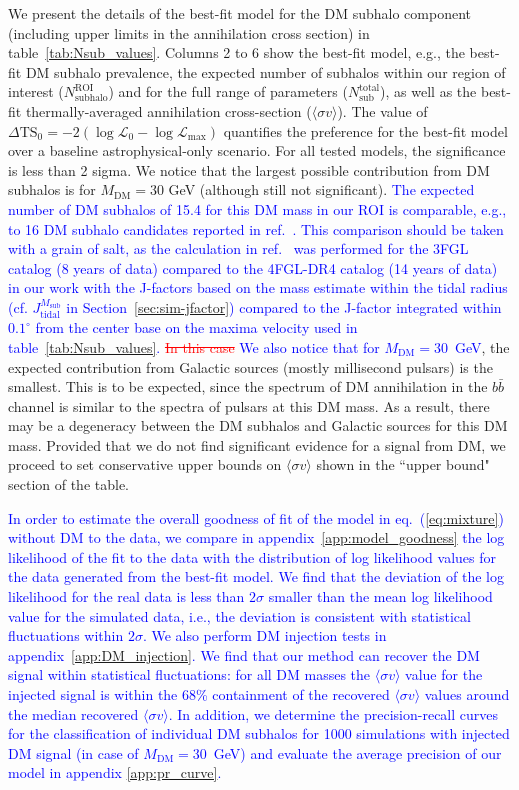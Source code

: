 \documentclass[12pt, a4paper]{article}
\newcommand{\new}[1]{\textcolor{blue}{#1}}
\newcommand{\old}[1]{\textcolor{red}{\st{#1}}}
\newcommand{\sigmav}{\langle \sigma v \rangle}
\newcommand{\Msub}{M_\textrm{sub}}
\newcommand{\mdm}{{M_\textrm{DM}}}
\begin{document}

We present the details of the best-fit model for the DM subhalo component (including upper limits in the annihilation cross section)
in table~\ref{tab:Nsub_values}.
Columns 2 to 6 show the best-fit model, e.g., the best-fit DM subhalo prevalence, the expected number of subhalos within our region of interest ($N_\textrm{subhalo}^\textrm{ROI}$) and for the full range of parameters ($N_\textrm{sub}^\textrm{total}$), as well as the best-fit thermally-averaged annihilation cross-section ($\sigmav$). The value of $\Delta \textrm{TS}_0 = -2(\log\mathcal{L}_0 - \log\mathcal{L}_\textrm{max})$ quantifies the preference for the best-fit model over a baseline astrophysical-only scenario. 
For all tested models, the significance is less than 2 sigma.
We notice that the largest possible contribution from DM subhalos is for $\mdm = 30$ GeV (although still not significant). 
\new{The expected number of DM subhalos of 15.4 for this DM mass  in our ROI is comparable, e.g., to 16 DM subhalo candidates reported in ref.~\cite{2019JCAP...07..020C}.
This comparison should be taken with a grain of salt, as the calculation in ref.~\cite{2019JCAP...07..020C} was performed for the 3FGL catalog (8 years of data) compared to the 4FGL-DR4 catalog (14 years of data) in our work with the J-factors based on the mass estimate within the tidal radius (cf. $J_\textrm{tidal}^{\Msub}$ in Section~\ref{sec:sim-jfactor}) compared to the J-factor integrated within $0.1^\circ$ from the center base on the maxima velocity used in table~\ref{tab:Nsub_values}.
}
\old{In this case} \new{We also notice that for $\mdm = 30$~GeV},  the expected contribution from Galactic sources (mostly millisecond pulsars) is the smallest.
This is to be expected, since the spectrum of DM annihilation in the $b\bar{b}$ channel is similar to the spectra of pulsars at this DM mass.
As a result, there may be a degeneracy between the DM subhalos and Galactic sources for this DM mass.
Provided that we do not find significant evidence for a signal from DM, we proceed to set conservative upper bounds on $\sigmav$ shown in the ``upper bound" section of the table.

\new{
In order to estimate the overall goodness of fit of the model in eq.~(\ref{eq:mixture}) without DM to the data,
we compare in appendix~\ref{app:model_goodness} the log likelihood of the fit to the data with the distribution of log likelihood values for the data generated from the best-fit model.
We find that the deviation of the log likelihood for the real data is less than $2\sigma$ smaller than the mean log likelihood value for the simulated data, i.e., the deviation is consistent with statistical fluctuations within $2\sigma$.
We also perform DM injection tests in appendix~\ref{app:DM_injection}.
We find that our method can recover the DM signal within statistical fluctuations: for all DM masses the  $\sigmav$ value for the injected signal is within the 68\% containment of the recovered $\sigmav$ values around the median recovered $\sigmav$.
}
\new{In addition, we determine the precision-recall curves for the classification of individual DM subhalos for 1000 simulations with injected DM signal (in case of $\mdm = 30$~GeV) and evaluate the average precision of our model in appendix \ref{app:pr_curve}.}
\end{document}
